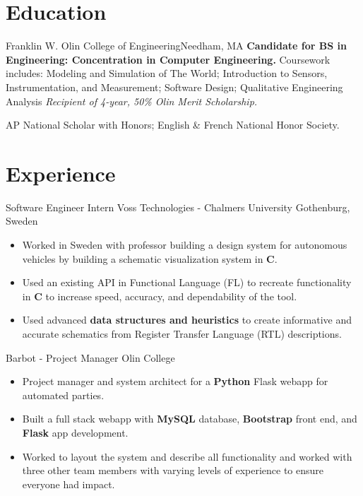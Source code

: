 \documentclass[11 pt]{moderncv}
\begin{document}
\maketitle

\vspace{-.6in}

\section{Education}

{Franklin W. Olin College of Engineering}{}{Needham, MA}{}
{
	\textbf{Candidate for BS in Engineering: Concentration in Computer Engineering.}
	  Coursework includes:
    Modeling and Simulation of The World;
    Introduction to Sensors, Instrumentation, and Measurement;
    Software Design;
    Qualitative Engineering Analysis
	\newline
	\textit{Recipient of 4-year, 50\% Olin Merit Scholarship.}
}

{
	AP National Scholar with Honors; English \& French National Honor Society.
	\begin{flushright}
	\vspace {-0.3 in}
	\end{flushright}
	\vspace {-0.1 in}
}

\section{Experience}
\vspace{0.06 in}

{Software Engineer Intern}
{Voss Technologies - Chalmers University}
{Gothenburg, Sweden}
{}
{
\begin{itemize}
	\item Worked in Sweden with professor building a design system for autonomous vehicles by building a schematic visualization system in \textbf{C}. 
	\item Used an existing API in Functional Language (FL) to recreate functionality in \textbf{C} to increase speed, accuracy, and dependability of the tool. 
	\item Used advanced \textbf{data structures and heuristics} to create informative and accurate schematics from Register Transfer Language (RTL) descriptions.
\end{itemize}
}


{Barbot -  Project Manager}
{Olin College}
{}
{}
{
\begin{itemize}
	\item Project manager and system architect for a \textbf{Python} Flask webapp for automated parties. 
	\item Built a full stack webapp with \textbf{MySQL} database, \textbf{Bootstrap} front end, and \textbf{Flask} app development. 
	\item Worked to layout the system and describe all functionality and worked with three other team members with varying levels of experience to ensure everyone had impact. 
\end{itemize}
}
\end{document}
